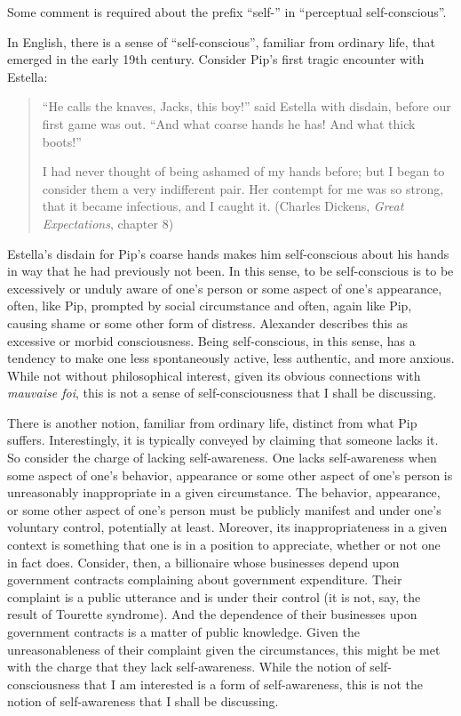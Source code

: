 Some comment is required about the prefix ``self-'' in ``perceptual self-conscious''.

In English, there is a sense of ``self-conscious'', familiar from ordinary life, that emerged in the early 19th century. Consider Pip's first tragic encounter with Estella:
\begin{quotation}
	``He calls the knaves, Jacks, this boy!'' said Estella with disdain, before our first game was out. ``And what coarse hands he has! And what thick boots!'' 

	I had never thought of being ashamed of my hands before; but I began to consider them a very indifferent pair. Her contempt for me was so strong, that it became infectious, and I caught it. (Charles Dickens, \emph{Great Expectations}, chapter 8)
\end{quotation}
Estella's disdain for Pip's coarse hands makes him self-conscious about his hands in way that he had previously not been. In this sense, to be self-conscious is to be excessively or unduly aware of one's person or some aspect of one's appearance, often, like Pip, prompted by social circumstance and often, again like Pip, causing shame or some other form of distress. Alexander \citet[93]{Bain:1872nu} describes this as excessive or morbid consciousness. Being self-conscious, in this sense, has a tendency to make one less spontaneously active, less authentic, and more anxious. While not without philosophical interest, given its obvious connections with \emph{mauvaise foi}, this is not a sense of self-consciousness that I shall be discussing.

There is another notion, familiar from ordinary life, distinct from what Pip suffers. Interestingly, it is typically conveyed by claiming that someone lacks it. So consider the charge of lacking self-awareness. One lacks self-awareness when some aspect of one's behavior, appearance or some other aspect of one's person is unreasonably inappropriate in a given circumstance. The behavior, appearance, or some other aspect of one's person must be publicly manifest and under one's voluntary control, potentially at least. Moreover, its inappropriateness in a given context is something that one is in a position to appreciate, whether or not one in fact does. Consider, then, a billionaire whose businesses depend upon government contracts complaining about government expenditure. Their complaint is a public utterance and is under their control (it is not, say, the result of Tourette syndrome). And the dependence of their businesses upon government contracts is a matter of public knowledge. Given the unreasonableness of their complaint given the circumstances, this might be met with the charge that they lack self-awareness. While the notion of self-consciousness that I am interested is a form of self-awareness, this is not the notion of self-awareness that I shall be discussing.

